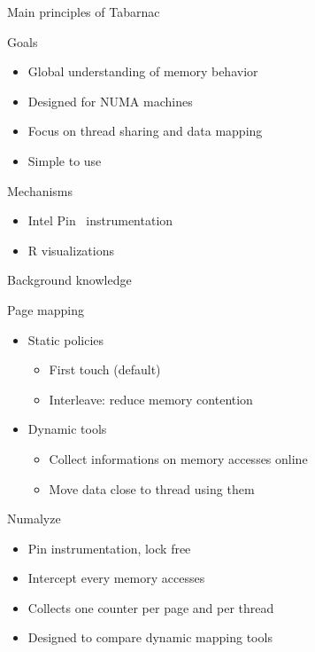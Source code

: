 \documentclass[xcolor={usenames,dvipsnames},hyperref={pdfusetitle}]{beamer}
\begin{document}
\begin{frame}{Main principles of Tabarnac}
    \begin{block}{Goals}
        \begin{itemize}
            \item Global understanding of memory behavior
            \item Designed for NUMA machines
            \item Focus on thread sharing and data mapping
            \item Simple to use
        \end{itemize}
    \end{block}
    \pause
    \begin{exampleblock}{Mechanisms}
        \begin{itemize}
            \item Intel Pin~\cite{Luk05Pin} instrumentation
            \item R visualizations
        \end{itemize}
    \end{exampleblock}
\end{frame}

\begin{frame}{Background knowledge}
    \begin{block}{Page mapping}
        \begin{itemize}
            \item  Static policies
                \begin{itemize}
                    \item First touch (default)
                    \item Interleave: reduce memory contention
                \end{itemize}
            \item Dynamic tools~\cite{Corbet12Toward,Diener14kMAF}
                \begin{itemize}
                    \item Collect informations on memory accesses online
                    \item Move data close to thread using them
                \end{itemize}
        \end{itemize}
    \end{block}
    \pause
    \begin{exampleblock}{Numalyze~\cite{Diener15Characterizing}}
        \begin{itemize}
            \item Pin instrumentation, lock free
            \item Intercept every memory accesses
            \item Collects one counter per page and per thread
            \item Designed to compare dynamic mapping tools
        \end{itemize}
    \end{exampleblock}
\end{frame}
\end{document}

